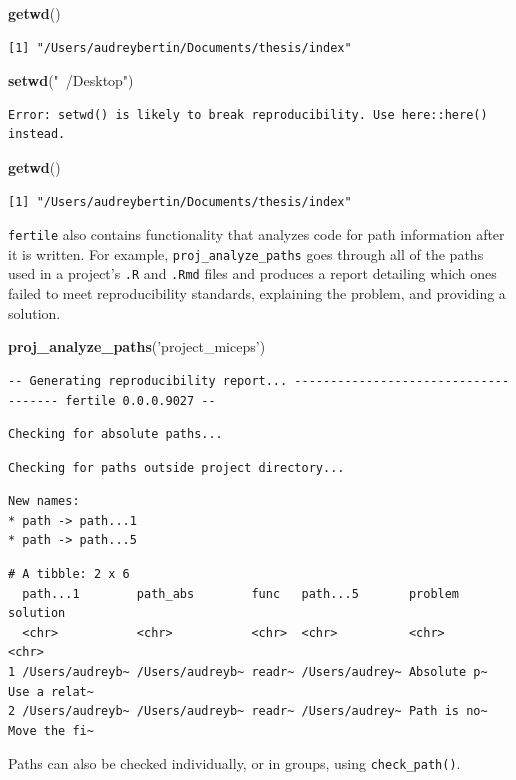 \documentclass[12pt,twoside]{reedthesis}
\newenvironment{Shaded}{\begin{snugshade}}{\end{snugshade}}
\newcommand{\KeywordTok}[1]{\textcolor[rgb]{0.13,0.29,0.53}{\textbf{#1}}}
\newcommand{\StringTok}[1]{\textcolor[rgb]{0.31,0.60,0.02}{#1}}
\newcommand{\NormalTok}[1]{#1}
\begin{document}
\footnotesize
\begin{Shaded}
\begin{Highlighting}[]
\KeywordTok{getwd}\NormalTok{()}
\end{Highlighting}
\end{Shaded}
\begin{verbatim}
[1] "/Users/audreybertin/Documents/thesis/index"
\end{verbatim}
\begin{Shaded}
\begin{Highlighting}[]
\KeywordTok{setwd}\NormalTok{(}\StringTok{"~/Desktop"}\NormalTok{)}
\end{Highlighting}
\end{Shaded}
\begin{verbatim}
Error: setwd() is likely to break reproducibility. Use here::here() instead.
\end{verbatim}
\begin{Shaded}
\begin{Highlighting}[]
\KeywordTok{getwd}\NormalTok{()}
\end{Highlighting}
\end{Shaded}
\begin{verbatim}
[1] "/Users/audreybertin/Documents/thesis/index"
\end{verbatim}
\texttt{fertile} also contains functionality that analyzes code for path
information after it is written. For example,
\texttt{proj\_analyze\_paths} goes through all of the paths used in a
project's \texttt{.R} and \texttt{.Rmd} files and produces a report
detailing which ones failed to meet reproducibility standards,
explaining the problem, and providing a solution.
\begin{Shaded}
\begin{Highlighting}[]
\KeywordTok{proj_analyze_paths}\NormalTok{(}\StringTok{'project_miceps'}\NormalTok{)}
\end{Highlighting}
\end{Shaded}
\begin{verbatim}
-- Generating reproducibility report... ------------------------------------- fertile 0.0.0.9027 --
\end{verbatim}
\begin{verbatim}
Checking for absolute paths...
\end{verbatim}
\begin{verbatim}
Checking for paths outside project directory...
\end{verbatim}
\begin{verbatim}
New names:
* path -> path...1
* path -> path...5
\end{verbatim}
\begin{verbatim}
# A tibble: 2 x 6
  path...1        path_abs        func   path...5       problem     solution    
  <chr>           <chr>           <chr>  <chr>          <chr>       <chr>       
1 /Users/audreyb~ /Users/audreyb~ readr~ /Users/audrey~ Absolute p~ Use a relat~
2 /Users/audreyb~ /Users/audreyb~ readr~ /Users/audrey~ Path is no~ Move the fi~
\end{verbatim}
Paths can also be checked individually, or in groups, using
\texttt{check\_path()}.
\end{document}
